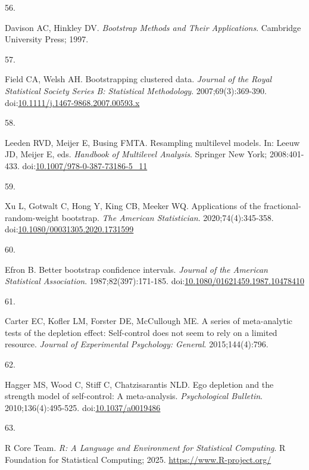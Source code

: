 \documentclass[
  american,
  man, donotrepeattitle,floatsintext]{apa7}
\newlength{\cslhangindent}
\newlength{\csllabelwidth}
\newenvironment{CSLReferences}[2] %
 {\begin{list}{}{%
  \setlength{\itemindent}{0pt}
  \setlength{\leftmargin}{0pt}
  \setlength{\parsep}{0pt}
  \ifodd #1
   \setlength{\leftmargin}{\cslhangindent}
   \setlength{\itemindent}{-1\cslhangindent}
  \fi
  \setlength{\itemsep}{#2\baselineskip}}}
 {\end{list}}
\newcommand{\CSLLeftMargin}[1]{\parbox[t]{\csllabelwidth}{\strut#1\strut}}
\newcommand{\CSLRightInline}[1]{\parbox[t]{\linewidth - \csllabelwidth}{\strut#1\strut}}
\begin{document}
\begin{CSLReferences}{0}{1}
\CSLLeftMargin{56. }%
\CSLRightInline{Davison AC, Hinkley DV. \emph{Bootstrap Methods and Their Applications}. Cambridge University Press; 1997.}

\CSLLeftMargin{57. }%
\CSLRightInline{Field CA, Welsh AH. Bootstrapping clustered data. \emph{Journal of the Royal Statistical Society Series B: Statistical Methodology}. 2007;69(3):369-390. doi:\href{https://doi.org/10.1111/j.1467-9868.2007.00593.x}{10.1111/j.1467-9868.2007.00593.x}}

\CSLLeftMargin{58. }%
\CSLRightInline{Leeden RVD, Meijer E, Busing FMTA. Resampling multilevel models. In: Leeuw JD, Meijer E, eds. \emph{Handbook of {Multilevel} {Analysis}}. Springer New York; 2008:401-433. doi:\href{https://doi.org/10.1007/978-0-387-73186-5_11}{10.1007/978-0-387-73186-5\_11}}

\CSLLeftMargin{59. }%
\CSLRightInline{Xu L, Gotwalt C, Hong Y, King CB, Meeker WQ. Applications of the fractional-random-weight bootstrap. \emph{The American Statistician}. 2020;74(4):345-358. doi:\href{https://doi.org/10.1080/00031305.2020.1731599}{10.1080/00031305.2020.1731599}}

\CSLLeftMargin{60. }%
\CSLRightInline{Efron B. Better bootstrap confidence intervals. \emph{Journal of the American Statistical Association}. 1987;82(397):171-185. doi:\href{https://doi.org/10.1080/01621459.1987.10478410}{10.1080/01621459.1987.10478410}}

\CSLLeftMargin{61. }%
\CSLRightInline{Carter EC, Kofler LM, Forster DE, McCullough ME. A series of meta-analytic tests of the depletion effect: Self-control does not seem to rely on a limited resource. \emph{Journal of Experimental Psychology: General}. 2015;144(4):796.}

\CSLLeftMargin{62. }%
\CSLRightInline{Hagger MS, Wood C, Stiff C, Chatzisarantis NLD. Ego depletion and the strength model of self-control: {A} meta-analysis. \emph{Psychological Bulletin}. 2010;136(4):495-525. doi:\href{https://doi.org/10.1037/a0019486}{10.1037/a0019486}}

\CSLLeftMargin{63. }%
\CSLRightInline{R Core Team. \emph{R: A Language and Environment for Statistical Computing}. R Foundation for Statistical Computing; 2025. \url{https://www.R-project.org/}}


\end{CSLReferences}
\end{document}
